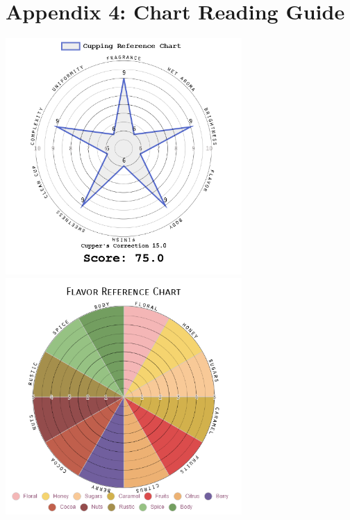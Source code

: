 \documentclass[10pt,twoside,footinclude=true,headinclude=true]{scrbook} %
\renewcommand*\raggedchapter{\centering}
\begin{document}
\renewcommand*\raggedchapter{\raggedright}
\chapter*{Appendix 4: Chart Reading Guide}
\centering
\includegraphics[width=9cm]{cupping.png} \\
\includegraphics[width=9cm]{flavor.png}

\end{document}
